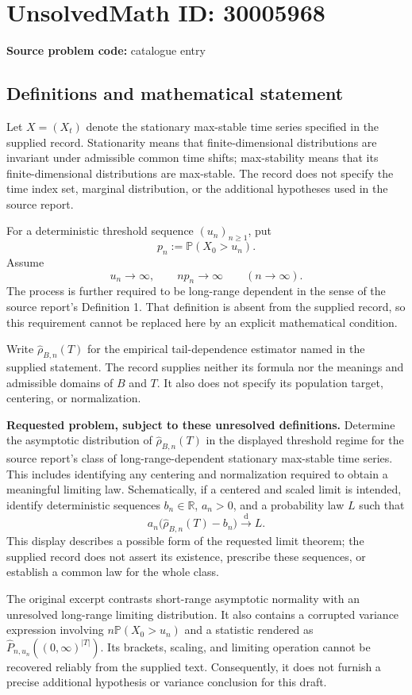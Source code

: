 \documentclass[11pt]{article}
\newcommand{\R}{\mathbb{R}}
\begin{document}
\section*{UnsolvedMath ID: 30005968}
\textbf{Source problem code:} catalogue entry
\subsection{Definitions and mathematical statement}
Let \(X=(X_t)\) denote the stationary max-stable time series specified in the supplied record. Stationarity means that finite-dimensional distributions are invariant under admissible common time shifts; max-stability means that its finite-dimensional distributions are max-stable. The record does not specify the time index set, marginal distribution, or the additional hypotheses used in the source report.

For a deterministic threshold sequence \((u_n)_{n\geq 1}\), put
\[
 p_n:=\mathbb P(X_0>u_n).
\]
Assume
\[
 u_n\longrightarrow\infty,
 \qquad n p_n\longrightarrow\infty
 \qquad(n\longrightarrow\infty).
\]
The process is further required to be long-range dependent in the sense of the source report's Definition 1. That definition is absent from the supplied record, so this requirement cannot be replaced here by an explicit mathematical condition.

Write \(\widehat\rho_{B,n}(T)\) for the empirical tail-dependence estimator named in the supplied statement. The record supplies neither its formula nor the meanings and admissible domains of \(B\) and \(T\). It also does not specify its population target, centering, or normalization.

\textbf{Requested problem, subject to these unresolved definitions.} Determine the asymptotic distribution of \(\widehat\rho_{B,n}(T)\) in the displayed threshold regime for the source report's class of long-range-dependent stationary max-stable time series. This includes identifying any centering and normalization required to obtain a meaningful limiting law. Schematically, if a centered and scaled limit is intended, identify deterministic sequences \(b_n\in\R\), \(a_n>0\), and a probability law \(L\) such that
\[
 a_n\bigl(\widehat\rho_{B,n}(T)-b_n\bigr)
 \xrightarrow{\mathrm d} L.
\]
This display describes a possible form of the requested limit theorem; the supplied record does not assert its existence, prescribe these sequences, or establish a common law for the whole class.

The original excerpt contrasts short-range asymptotic normality with an unresolved long-range limiting distribution. It also contains a corrupted variance expression involving \(n\mathbb P(X_0>u_n)\) and a statistic rendered as \(\widehat P_{n,u_n}((0,\infty)^{|T|})\). Its brackets, scaling, and limiting operation cannot be recovered reliably from the supplied text. Consequently, it does not furnish a precise additional hypothesis or variance conclusion for this draft.
\end{document}
